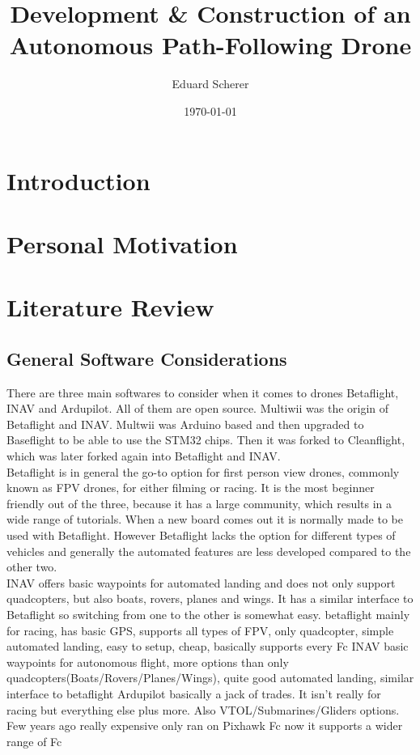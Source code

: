 \documentclass{article}
\author{Eduard Scherer}
\title{Development \& Construction of an Autonomous Path-Following Drone}
\date{\today}
\newcommand{\comment}[1]{}
\begin{document}
\maketitle
	\section{Introduction}
	\comment{do at the end of the writing process
	\\maybe a quick explanation of the term "drone"
	\\ drones are being used in war more and more self-built ones(Blheli32 is dead, because of the use in wars.)
	\\ article about more and more autonomous drones in the Ukraine-Russia War
}
	\section{Personal Motivation}
	\comment{rather short}
	\section{Literature Review}
	\subsection{General Software Considerations}
	\comment{why I choose the software
	(work around the same topic that already exists)}
	
	There are three main softwares to consider when it comes to drones Betaflight, INAV and Ardupilot. All of them are open source. Multiwii was the origin of Betaflight and INAV. Multwii was Arduino based and then upgraded to Baseflight to be able to use the STM32 chips. Then it was forked to Cleanflight, which was later forked again into Betaflight and INAV\cite{Abriefhistoryofaflightcontroller-FromMultiWiitoBetaflightandbeyond}. 
	\\Betaflight is in general the go-to option for first person view drones, commonly known as FPV drones, for either filming or racing. It is the most beginner friendly out of the three, because it has a large community, which results in a wide range of tutorials. When a new board comes out it is normally made to be used with Betaflight. However Betaflight lacks the option for different types of vehicles and generally the automated features are less developed compared to the other two. 
	\\ INAV offers basic waypoints for automated landing and does not only support quadcopters, but also boats, rovers, planes and wings. It has a similar interface to Betaflight so switching from one to the other is somewhat easy.
	betaflight mainly for racing, has basic GPS, supports all types of FPV, only quadcopter, simple automated landing, easy to setup, cheap, basically supports every Fc
	INAV basic waypoints for autonomous flight, more options than only quadcopters(Boats/Rovers/Planes/Wings), quite good automated landing, similar interface to betaflight
	Ardupilot basically a jack of trades. It isn't really for racing but everything else plus more. Also VTOL/Submarines/Gliders options. Few years ago really expensive only ran on Pixhawk Fc now it supports a wider range of Fc
	
\end{document}
